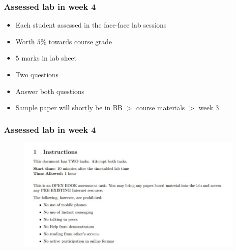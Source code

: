 \documentclass[english,14pt]{beamer}
\begin{document}

\begin{frame}[fragile]

\frametitle{Assessed lab in week 4}

\begin{itemize}
	\item Each student assessed in the face-face lab sessions
	\item Worth $5$\% towards course grade
	\item $5$ marks in lab sheet
	\item Two questions
	\item Answer both questions
	\item Sample paper will shortly be in BB $>$ course materials $>$ week 3 
\end{itemize}

\end{frame}


\begin{frame}[fragile]

\frametitle{Assessed lab in week 4}

\vspace*{-10mm}
\begin{figure}[ht]
	\centering
	\includegraphics[width=1.05\textwidth]{figures/AssessedLab1Cover}
\end{figure}

\end{frame}
\end{document}
